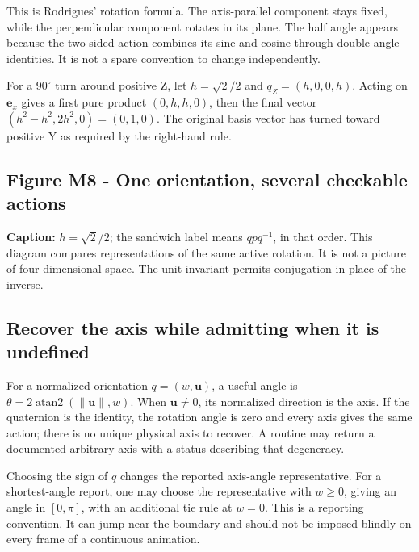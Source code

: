 This is Rodrigues' rotation formula. The axis-parallel component stays fixed, while the perpendicular component rotates in its plane. The half angle appears because the two-sided action combines its sine and cosine through double-angle identities. It is not a spare convention to change independently.

For a \(90^\circ\) turn around positive Z, let \(h=\sqrt2/2\) and \(q_Z=(h,0,0,h)\). Acting on \(\mathbf e_x\) gives a first pure product \((0,h,h,0)\), then the final vector \((h^2-h^2,2h^2,0)=(0,1,0)\). The original basis vector has turned toward positive Y as required by the right-hand rule.

\subsection{Figure M8 - One orientation, several checkable actions}\label{01-foundations-i-ch019-figure-m8---one-orientation-several-checkable-actions}

\hypertarget{01-foundations-i-ch019-figure-m8---one-orientation-several-checkable-actions}{}


\textbf{Caption:} \(h=\sqrt2/2\); the sandwich label means \(qpq^{-1}\), in that order. This diagram compares representations of the same active rotation. It is not a picture of four-dimensional space. The unit invariant permits conjugation in place of the inverse.

\subsection{Recover the axis while admitting when it is undefined}\label{01-foundations-i-ch019-recover-the-axis-while-admitting-when-it-is-undefined}

\hypertarget{01-foundations-i-ch019-recover-the-axis-while-admitting-when-it-is-undefined}{}

For a normalized orientation \(q=(w,\mathbf u)\), a useful angle is \(\theta=2\operatorname{atan2}(\|\mathbf u\|,w)\). When \(\mathbf u\ne0\), its normalized direction is the axis. If the quaternion is the identity, the rotation angle is zero and every axis gives the same action; there is no unique physical axis to recover. A routine may return a documented arbitrary axis with a status describing that degeneracy.

Choosing the sign of \(q\) changes the reported axis-angle representative. For a shortest-angle report, one may choose the representative with \(w\ge0\), giving an angle in \([0,\pi]\), with an additional tie rule at \(w=0\). This is a reporting convention. It can jump near the boundary and should not be imposed blindly on every frame of a continuous animation.

